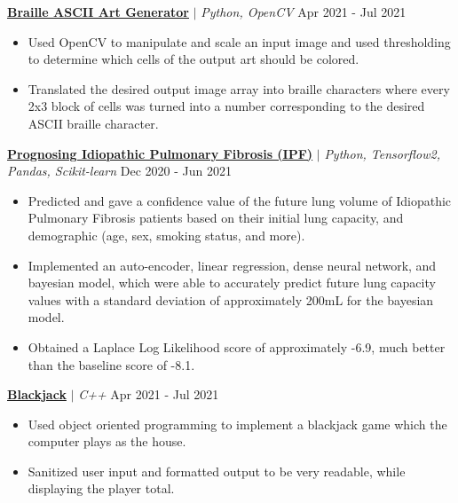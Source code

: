 \documentclass{article}
\newcommand{\smallbullet}{\,\begin{picture}(-1,1)(-1,-3)\circle*{3}\end{picture}\ }
\newenvironment{resumeItem}
{
    \vspace{0.5em}
}
{
}
\newcommand{\projectHead}[3]{
    \textbf{#1} $\vert$ \textit{#2} \hfill #3 \\[-1.2em]
}
\newenvironment{resumeList}
{
    \begin{itemize}[label=\smallbullet]
}
{
    \end{itemize}
}
\begin{document}
\begin{resumeItem}
\projectHead{\href{https://github.com/arnavcs/ASCII-art}{Braille ASCII Art Generator}}{Python, OpenCV}{Apr 2021 - Jul 2021}
\begin{resumeList}
    \item Used OpenCV to manipulate and scale an input image and used thresholding to determine which cells of the output art should be colored.
    \item Translated the desired output image array into braille characters where every 2x3 block of cells was turned into a number corresponding to the desired ASCII braille character.
\end{resumeList}
\end{resumeItem}

\begin{resumeItem}
\projectHead{\href{https://github.com/arnavcs/OSIC-IPF}{Prognosing Idiopathic Pulmonary Fibrosis (IPF)}}{Python, Tensorflow2, Pandas, Scikit-learn}{Dec 2020 - Jun 2021}
\begin{resumeList}
    \item Predicted and gave a confidence value of the future lung volume of Idiopathic Pulmonary Fibrosis patients based on their initial lung capacity, and demographic (age, sex, smoking status, and more).
    \item Implemented an auto-encoder, linear regression, dense neural network, and bayesian model, which were able to accurately predict future lung capacity values with a standard deviation of approximately 200mL for the bayesian model.
    \item Obtained a Laplace Log Likelihood score of approximately -6.9, much better than the baseline score of -8.1.
\end{resumeList}
\end{resumeItem}

\begin{resumeItem}
\projectHead{\href{https://github.com/arnavcs/black-jack}{Blackjack}}{C++}{Apr 2021 - Jul 2021}
\begin{resumeList}
    \item Used object oriented programming to implement a blackjack game which the computer plays as the house.
    \item Sanitized user input and formatted output to be very readable, while displaying the player total.
\end{resumeList}
\end{resumeItem}
\end{document}
